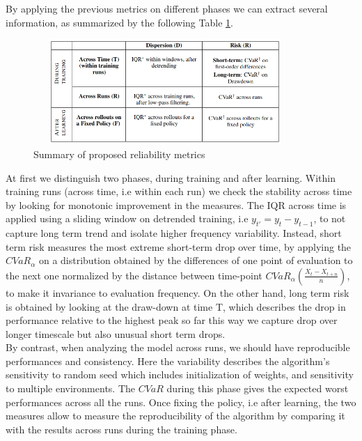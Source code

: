 \documentclass{article}
\begin{document}
By applying the previous metrics on different phases we can extract several information, as summarized by the following Table \ref{fig:table}.
\begin{figure}[!t]
	\centering
	\includegraphics[width=10cm, height=4cm]{./images/table.png}
	\caption{Summary of proposed reliability metrics~\cite{GoogleMeasure}}
	\label{fig:table}
	\footnotesize{}
\end{figure}
At first we distinguish two phases, during training and after learning.
Within training runs (across time, i.e within each run) we check the stability across time by looking for monotonic improvement in the measures.
The IQR across time is applied using a sliding window on detrended training, i.e $y_{t'} = y_{t} - y_{t-1}$, to not capture long term trend and isolate higher frequency variability.
Instead, short term risk measures the most extreme short-term drop over time, by applying the $CVaR_\alpha$ on a distribution obtained by the differences of one point of evaluation to the next one normalized by the distance between time-point $CVaR_\alpha \left(\frac{X_t - X_{t+n}}{n}\right)$, to make it invariance to evaluation frequency. On the other hand, long term risk is obtained by looking at the draw-down at time T, which describes the drop in performance relative to the highest peak so far this way we capture drop over longer timescale but also unusual short term drops.\\
By contrast, when analyzing the model across runs, we should have reproducible performances and consistency. Here the variability describes the algorithm’s sensitivity to random seed which includes initialization of weights, and sensitivity to multiple environments. The $CVaR$ during this phase gives the expected worst performances across all the runs.
Once fixing the policy, i.e after learning, the two measures allow to measure the reproducibility of the algorithm by comparing it with the results across runs during the training phase.
\end{document}
